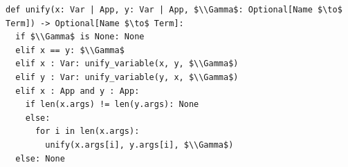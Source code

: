 \documentclass[border=10pt]{standalone}
\begin{document}
\begin{lstlisting}
def unify(x: Var | App, y: Var | App, $\\Gamma$: Optional[Name $\to$ Term]) -> Optional[Name $\to$ Term]:
  if $\\Gamma$ is None: None
  elif x == y: $\\Gamma$
  elif x : Var: unify_variable(x, y, $\\Gamma$)
  elif y : Var: unify_variable(y, x, $\\Gamma$)
  elif x : App and y : App:
    if len(x.args) != len(y.args): None
    else:
      for i in len(x.args):
        unify(x.args[i], y.args[i], $\\Gamma$)
  else: None
\end{lstlisting}
\end{document}
